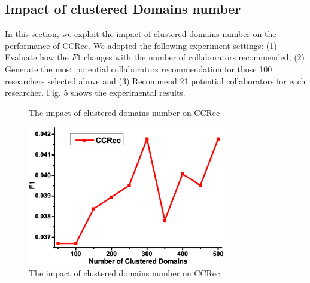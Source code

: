 \documentclass[review]{elsarticle}
\begin{document}
\subsection{Impact of clustered Domains number}
In this section, we exploit the impact of clustered domains number on the performance of CCRec. We adopted the following experiment settings: (1) Evaluate how the $F1$ changes with the number of collaborators recommended, (2) Generate the most potential collaborators recommendation for those 100 researchers selected above and (3) Recommend 21 potential collaborators for each researcher. Fig. 5 shows the experimental results.

\begin{figure}
\centering
{}
\caption{The impact of clustered domains number on CCRec}
\label{fig:6}
\end{figure}

\begin{figure}
\centering
\includegraphics [width=3.4in]{Fig4.eps}
\caption{The impact of clustered domains number on CCRec}
\end{figure}
\end{document}
